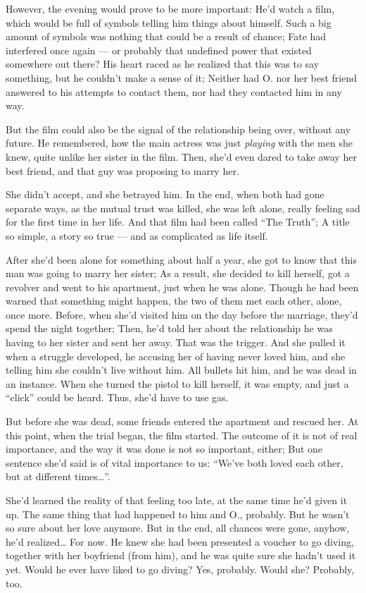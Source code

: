 However, the evening would prove to be more important: He'd watch a film, which would be full of symbols telling him things about himself. 
Such a big amount of symbols was nothing that could be a result of chance; Fate had interfered once again --- or probably that undefined power that existed somewhere out there?
His heart raced as he realized that this was to say something, but he couldn't make a sense of it; Neither had O. nor her best friend answered to his attempts to contact them, nor had they contacted him in any way.

But the film could also be the signal of the relationship being over, without any future. 
He remembered, how the main actress was just \emph{playing} with the men she knew, quite unlike her sister in the film. Then, she'd even dared to take away her best friend, and that guy was proposing to marry her.

She didn't accept, and she betrayed him. In the end, when both had gone separate ways, as the mutual trust was killed, she was left alone, really feeling sad for the first time in her life. And that film had been called \enquote{The Truth}; A title so simple, a story so true --- and as complicated as life itself.

After she'd been alone for something about half a year, she got to know that this man was going to marry her sister; As a result, she decided to kill herself, got a revolver and went to his apartment, just when he was alone. Though he had been warned that something might happen, the two of them met each other, alone, once more. Before, when she'd visited him on the day before the marriage, they'd spend the night together; Then, he'd told her about the relationship he was having to her sister and sent her away. 
That was the trigger. 
And she pulled it when a struggle developed, he accusing her of having never loved him, and she telling him she couldn't live without him. 
All bullets hit him, and he was dead in an instance. When she turned the pistol to kill herself, it was empty, and just a \enquote{click} could be heard.
Thus, she'd have to use gas.

But before she was dead, some friends entered the apartment and rescued her. 
At this point, when the trial began, the film started. 
The outcome of it is not of real importance, and the way it was done is not so important, either; But one sentence she'd said is of vital importance to us: \enquote{We've both loved each other, but at different times\dots{}}.

She'd learned the reality of that feeling too late, at the same time he'd given it up. 
The same thing that had happened to him and O., probably. But he wasn't so sure about her love anymore. 
But in the end, all chances were gone, anyhow, he'd realized\dots{}
For now. 
He knew she had been presented a voucher to go diving, together with her boyfriend (from him), and he was quite sure she hadn't used it yet. Would he ever have liked to go diving? Yes, probably. 
Would she? Probably, too.

